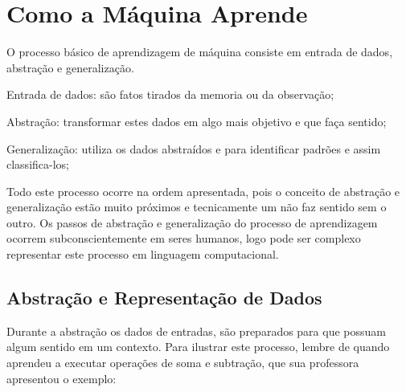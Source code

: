 \section{Como a Máquina Aprende}
\label{sec:howdoesmachinelearn}

O processo básico de aprendizagem de máquina consiste em entrada de dados, abstração e generalização.
\begin{alineas}
	\item Entrada de dados: são fatos tirados da memoria ou da observação;
	\item Abstração: transformar estes dados em algo mais objetivo e que faça sentido;
	\item Generalização: utiliza os dados abstraídos e para  identificar padrões e assim classifica-los;			
\end{alineas}

\begin{figure}[h!]
	\centering
\end{figure}

Todo este processo ocorre na ordem apresentada, pois o conceito de abstração e generalização estão muito próximos e tecnicamente um não faz sentido sem o outro. Os passos de abstração e generalização do processo de aprendizagem ocorrem subconscientemente em seres humanos, logo pode ser complexo representar este processo em linguagem computacional.


\subsection{Abstração e Representação de Dados}
\label{subsec:abs-representacao-dados}

Durante a abstração os dados de entradas, são preparados para que possuam algum sentido em um contexto.
Para ilustrar este processo, lembre de quando aprendeu a executar operações de soma e subtração, que sua professora apresentou o exemplo:

\begin{figure}[ht!]
	\centering
\end{figure}

